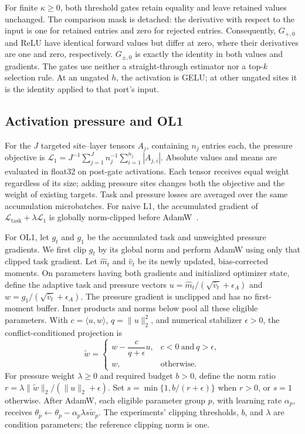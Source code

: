 For finite $\kappa\geq0$, both threshold gates retain equality and leave retained values unchanged.
The comparison mask is detached: the derivative with respect to the input
is one for retained entries and zero for rejected entries. Consequently,
$G_{+,0}$ and ReLU have identical forward values but differ at zero, where
their derivatives are one and zero, respectively. $G_{\pm,0}$ is exactly the
identity in both values and gradients. The gates use neither a straight-through
estimator nor a top-$k$ selection rule. At an ungated $h$, the activation is
GELU; at other ungated sites it is the identity applied to that port's input.

\subsection{Activation pressure and OL1}
\label{app:pressure}

For the $J$ targeted site--layer tensors $A_j$, containing $n_j$ entries each,
the pressure objective is
$\mathcal{L}_1=J^{-1}\sum_{j=1}^{J}n_j^{-1}\sum_{i=1}^{n_j}|A_{j,i}|$.
Absolute values and means are evaluated in float32 on post-gate activations.
Each tensor receives equal weight regardless of its size; adding pressure
sites changes both the objective and the weight of existing targets.
Task and pressure losses are averaged over the same accumulation microbatches.
For naive L1, the accumulated gradient of
$\mathcal{L}_{\mathrm{task}}+\lambda\mathcal{L}_1$ is globally norm-clipped
before AdamW~\citep{loshchilov2019adamw}.

For OL1, let $g_t$ and $g_1$ be the accumulated task and unweighted pressure
gradients. We first clip $g_t$ by its global norm and perform AdamW using only
that clipped task gradient. Let $\widehat m_t$ and $\widehat v_t$ be its newly
updated, bias-corrected moments. On parameters having both gradients and
initialized optimizer state, define the adaptive task and pressure vectors
$u=\widehat m_t/(\sqrt{\widehat v_t}+\epsilon_A)$ and
$w=g_1/(\sqrt{\widehat v_t}+\epsilon_A)$. The pressure gradient is unclipped
and has no first-moment buffer. Inner products and norms below pool all these
eligible parameters. With $c=\langle u,w\rangle$, $q=\|u\|_2^2$, and numerical
stabilizer $\epsilon>0$, the conflict-conditioned projection is
\begin{equation}
\widetilde w=
\begin{cases}
w-\dfrac{c}{q+\epsilon}u, & c<0\ \text{and}\ q>\epsilon,\\[3pt]
w, & \text{otherwise}.
\end{cases}
\label{eq:ol1-projection}
\end{equation}
For pressure weight $\lambda\geq0$ and required budget $b>0$, define the norm ratio
$r=\lambda\|\widetilde w\|_2/(\|u\|_2+\epsilon)$. Set
$s=\min\{1,b/(r+\epsilon)\}$ when $r>0$, or $s=1$ otherwise. After AdamW,
each eligible parameter group $p$, with learning rate $\alpha_p$, receives
$\theta_p\leftarrow\theta_p-\alpha_p\lambda s\widetilde w_p$.
The experiments' clipping thresholds, $b$, and $\lambda$ are condition
parameters; the reference clipping norm is one.

